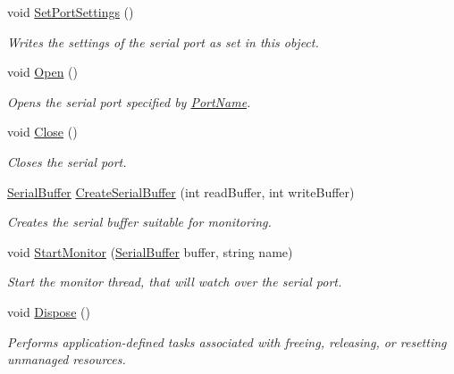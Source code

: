 \begin{DoxyCompactItemize}
void \mbox{\hyperlink{class_r_j_c_p_1_1_i_o_1_1_ports_1_1_native_1_1_unix_native_serial_a9d3928485a0b39df2c5d72f17036b4eb}{Set\+Port\+Settings}} ()
\begin{DoxyCompactList}\small\item\em Writes the settings of the serial port as set in this object. \end{DoxyCompactList}\item 
void \mbox{\hyperlink{class_r_j_c_p_1_1_i_o_1_1_ports_1_1_native_1_1_unix_native_serial_ac8b904202bb173a4575fd8f76472de0d}{Open}} ()
\begin{DoxyCompactList}\small\item\em Opens the serial port specified by \mbox{\hyperlink{class_r_j_c_p_1_1_i_o_1_1_ports_1_1_native_1_1_unix_native_serial_af4193d59c957f5454dca6e3cd41ac3a4}{Port\+Name}}. \end{DoxyCompactList}\item 
void \mbox{\hyperlink{class_r_j_c_p_1_1_i_o_1_1_ports_1_1_native_1_1_unix_native_serial_aa1f5e5c1b74fbac54b63578c9a43ac86}{Close}} ()
\begin{DoxyCompactList}\small\item\em Closes the serial port. \end{DoxyCompactList}\item 
\mbox{\hyperlink{class_r_j_c_p_1_1_i_o_1_1_ports_1_1_native_1_1_serial_buffer}{Serial\+Buffer}} \mbox{\hyperlink{class_r_j_c_p_1_1_i_o_1_1_ports_1_1_native_1_1_unix_native_serial_ae5f713e425dbe5c51cbabd4ed2367869}{Create\+Serial\+Buffer}} (int read\+Buffer, int write\+Buffer)
\begin{DoxyCompactList}\small\item\em Creates the serial buffer suitable for monitoring. \end{DoxyCompactList}\item 
void \mbox{\hyperlink{class_r_j_c_p_1_1_i_o_1_1_ports_1_1_native_1_1_unix_native_serial_a1dff48491b2421e1310acdab46d80fbb}{Start\+Monitor}} (\mbox{\hyperlink{class_r_j_c_p_1_1_i_o_1_1_ports_1_1_native_1_1_serial_buffer}{Serial\+Buffer}} buffer, string name)
\begin{DoxyCompactList}\small\item\em Start the monitor thread, that will watch over the serial port. \end{DoxyCompactList}\item 
void \mbox{\hyperlink{class_r_j_c_p_1_1_i_o_1_1_ports_1_1_native_1_1_unix_native_serial_a2d24f2b011e090360140a1b54db6b98d}{Dispose}} ()
\begin{DoxyCompactList}\small\item\em Performs application-\/defined tasks associated with freeing, releasing, or resetting unmanaged resources. \end{DoxyCompactList}\end{DoxyCompactItemize}
